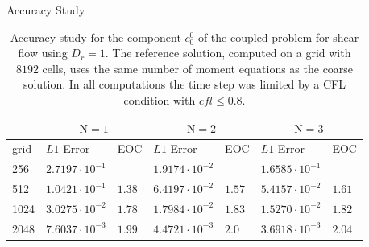 \begin{frame}{Accuracy Study}
\scriptsize
\begin{table}[ht]
	\centering
	\begin{tabular}{|l|l|l|l|l|l|l|}
		\hline 
		& \multicolumn{2}{|c|}{$\mathrm{N}=1$} & \multicolumn{2}{|c|}{$\mathrm{N}=2$} & \multicolumn{2}{|c|}{$\mathrm{N}=3$} \\
		\hline 
		grid & $L1$-Error & EOC  & $L1$-Error & EOC  & $L1$-Error & EOC  \\
		\hline
		256 & $2.7197  \cdot 10^{-1}$ & & $1.9174\cdot 10^{-2}$&&$1.6585 \cdot 10^{-1}$&\\
		\hline
		512 & $1.0421 \cdot 10^{-1}$ &$1.38$ & $6.4197 \cdot 10^{-2}$&$1.57$&$ 5.4157 \cdot 10^{-2}$&$1.61$\\
		\hline 
		1024  &$3.0275 \cdot 10^{-2}$&$1.78$& $1.7984 \cdot 10^{-2}$&$1.83$&$ 1.5270 \cdot 10^{-2}$& $1.82$\\
		\hline
		2048 & $ 7.6037 \cdot 10^{-3}$ &$1.99$& $4.4721 \cdot 10^{-3}$&$2.0$&$3.6918 \cdot 10^{-3}$&$2.04$\\
		\hline
	\end{tabular}
	\caption{Accuracy study for the component $c^0_0$ of the coupled problem for shear flow using $D_r=1$. The reference solution, computed on a grid with $8192$ cells, uses the same number of moment equations as the coarse solution.  In all computations the time step was limited by a CFL condition with $cfl \leq 0.8$.}
	\label{tab:Dr=1_error_N=1,2,3vsN=1,2,3}
\end{table}
\end{frame}



